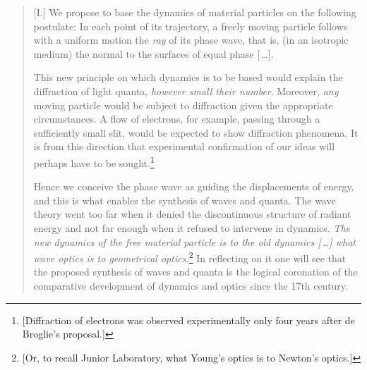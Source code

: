 \begin{quotation}
{[}I.{]} We propose to base the dynamics of material particles on the
following postulate: In each point of its trajectory, a freely moving
particle follows with a uniform motion the \emph{ray} of its phase wave,
that is, (in an isotropic medium) the normal to the surfaces of equal
phase [\,\ldots].

This new principle on which dynamics is to be based would explain the
diffraction of light quanta, \emph{however small their number}.
Moreover, \emph{any} moving particle would be subject to diffraction
given the appropriate circumstances. A flow of electrons, for example,
passing through a sufficiently small slit, would be expected to show
diffraction phenomena. It is from this direction that experimental
confirmation of our ideas will perhaps have to be sought.\footnote{{[}Diffraction
  of electrons was observed experimentally only four years after de
  Broglie's proposal.{]}}

Hence we conceive the phase wave as guiding the displacements of energy,
and this is what enables the synthesis of waves and quanta. The wave
theory went too far when it denied the discontinuous structure of
radiant energy and not far enough when it refused to intervene in
dynamics. \emph{The new dynamics of the free material particle is to
the old dynamics [\,\ldots] what wave optics is to geometrical
optics.}\footnote{{[}Or, to recall Junior Laboratory, what Young's optics
  is to Newton's optics.{]}} In reflecting on it
one will see that the proposed synthesis of waves and quanta is the
logical coronation of the comparative development of dynamics and optics
since the 17th century.


\end{quotation}
